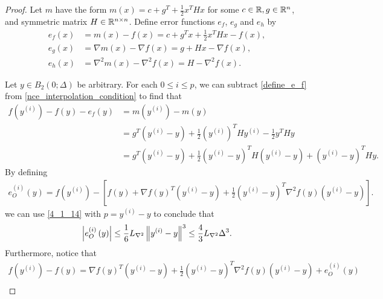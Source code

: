 \documentclass{article}
\begin{document}
\begin{proof}
Let $m$ have the form $m(x) = c + g^T + \frac 1 2 x^T H x$ for some 
$c \in \mathbb R, g \in \mathbb R^n$,  and symmetric matrix $H \in \mathbb R^{n \times n}$. 
Define error functions $e_f$, $e_g$ and $e_h$ by
\begin{align}
e_f(x) & = m(x)-f(x) = c + g^T x + \frac 1 2 x^T H x - f(x) \label{define_e_f}, \\
e_g(x) &= \nabla m(x)-\nabla f(x) = g + H x - \nabla f(x), \nonumber \\
e_h(x) &= \nabla^2 m(x)-\nabla^2 f(x) = H -\nabla^2 f(x). \nonumber
\end{align}

Let $y \in B_2(0; \Delta)$ be arbitrary.
For each $0 \le i \le p$, we can subtract \cref{define_e_f} from \cref{nce_interpolation_condition} to find that
\begin{align}
f\left(y^{(i)}\right) - f(y) - e_f(y)
&= m\left(y^{(i)}\right) - m(y) \nonumber \\
&= g^T\left(y^{(i)}-y\right)+\frac{1}{2}\left(y^{(i)}\right)^T H y^{(i)}-
\frac{1}{2} y^T H y\\
&=g^T  \left(y^{(i)} - y\right)  + \frac 1 2 \left(y^{(i)} - y\right)^T H \left(y^{(i)} - y\right) + \left(y^{(i)} - y\right)^T H y. \label{nec_eqn2}
\end{align}
By defining
\begin{align*}
e^{(i)}_O(y) = 
f\left(y^{(i)}\right) - \left[f(y) + \nabla f(y)^T \left(y^{(i)} - y\right) + \frac 1 2 \left(y^{(i)} - y\right)^T \nabla^2 f(y) \left(y^{(i)} - y\right)\right].
\end{align*}
we can use \cref{4_1_14} with  $p = y^{(i)} - y$ to conclude that
\begin{align}
\left|e^{(i)}_O\left(y\right) \right| \le \frac 1 6 {L_{\nabla^2}} \left\|y^{(i)} - y\right\|^3 \le \frac 4 3 {L_{\nabla^2}} \Delta^3 \label{nce_bound_rhs}.
\end{align}
Furthermore, notice that
\begin{align*}
f\left(y^{(i)}\right) - f(y)
= \nabla f(y)^T \left(y^{(i)} - y\right) + \frac 1 2 \left(y^{(i)} - y\right)^T \nabla^2 f(y) \left(y^{(i)} - y\right) + e^{(i)}_O\left(y\right) \\

\end{align*}
\end{proof}
\end{document}
